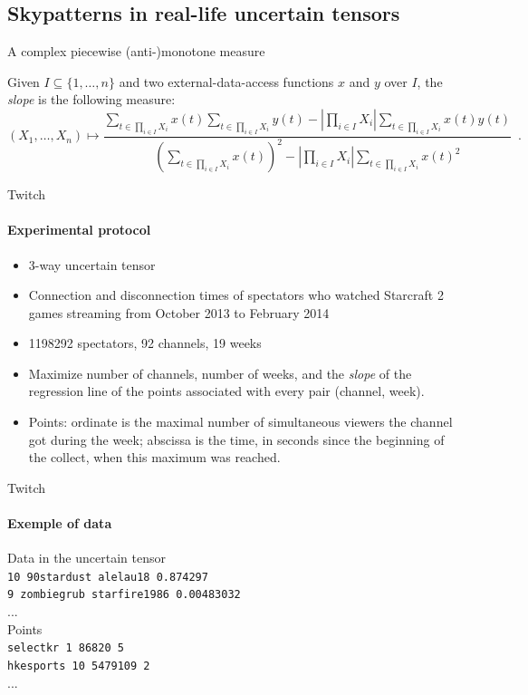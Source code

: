 \documentclass{beamer}
\begin{document}
\subsection{Skypatterns in real-life uncertain tensors}

\begin{frame}{A complex piecewise (anti-)monotone measure}
\begin{definition}[Slope]
  \label{def:slope}
  Given $I \subseteq \{1, \dots, n\}$ and two external-data-access
  functions $x$ and $y$ over $I$, the \emph{slope} is the following
  measure:
  \begin{displaymath}
    (X_1, \dots, X_n) \mapsto \frac{\displaystyle\sum_{t \in \prod_{i
          \in I} X_i} x(t) \sum_{t \in \prod_{i \in I} X_i} y(t) -
      \left|\prod_{i \in I} X_i\right|\sum_{t \in \prod_{i \in I} X_i}
      x(t)y(t)}{\displaystyle\left(\sum_{t \in \prod_{i \in I} X_i}
        x(t)\right)^2 - \left|\prod_{i \in I} X_i\right|\sum_{t \in
        \prod_{i \in I}X_i} x(t)^2} \enspace .
  \end{displaymath}
\end{definition}
\end{frame}

\begin{frame}{Twitch}
  \framesubtitle{Experimental protocol}
  \begin{itemize}
      \item 3-way uncertain tensor
      \item Connection and disconnection times of spectators who watched Starcraft 2 games streaming from October 2013 to February 2014
      \item 1198292 spectators, 92 channels, 19 weeks
      \item Maximize number of channels, number of weeks, and the \emph{slope} of the regression line of the points associated with every pair (channel, week).
      \item Points: ordinate is the maximal number of simultaneous viewers the
channel got during the week; abscissa is the time, in seconds since the
beginning of the collect, when this maximum was reached.
  \end{itemize}

\end{frame}

\begin{frame}{Twitch}
  \framesubtitle{Exemple of data}
  Data in the uncertain tensor\\
  \texttt{10 90stardust alelau18 0.874297}\\
  \texttt{9 zombiegrub starfire1986 0.00483032}\\
  ...\\
  Points\\
  \texttt{selectkr 1 86820 5}\\
  \texttt{hkesports 10 5479109 2}\\
  ...
\end{frame}
\end{document}
